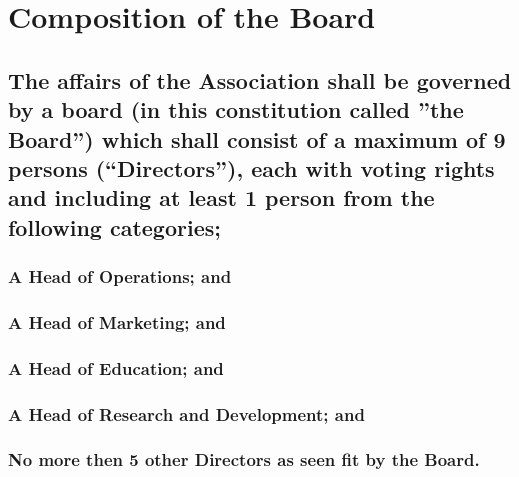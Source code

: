 \documentclass{article}
\newenvironment{subs}
  {\adjustwidth{2em}{0pt}}
  {\endadjustwidth}
\begin{document}
\section{Composition of the Board}
\begin{subs}
\subsection{The affairs of the Association shall be governed by a board (in this constitution called ''the Board'') which shall consist of a maximum of 9 persons (``Directors''), each with voting rights and including at least 1 person from the following categories;}
\begin{subs}
\subsubsection{A Head of Operations; and}
\subsubsection{A Head of Marketing; and}
\subsubsection{A Head of Education; and}
\subsubsection{A Head of Research and Development; and}
\subsubsection{No more then 5 other Directors as seen fit by the Board.}
\end{subs}
\end{subs}
\end{document}
